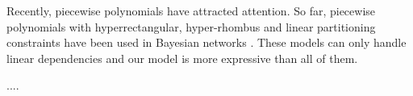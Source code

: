 \documentclass{article}
\begin{document}
{Recently, piecewise polynomials have attracted attention.
So far, piecewise polynomials with hyperrectangular, hyper-rhombus and linear partitioning constraints have been used in Bayesian networks \cite{shenoy2011inference,shenoy2012two,Sanner:12}.
These models can only handle linear dependencies and 
our model is more expressive than all of them. 

....


}%
\end{document}
